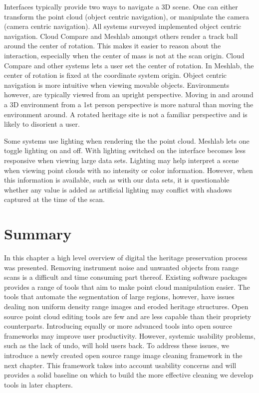 Interfaces typically provide two ways to navigate a 3D scene. One can either transform the point cloud (object centric navigation), or manipulate the camera (camera centric navigation). All systems surveyed implemented object centric navigation. Cloud Compare and Meshlab amongst others render a track ball around the center of rotation. This makes it easier to reason about the interaction, especially when the center of mass is not at the scan origin. Cloud Compare and other systems lets a user set the center of rotation. In Meshlab, the center of rotation is fixed at the coordinate system origin. Object centric navigation is more intuitive when viewing movable objects. Environments however, are typically viewed from an upright perspective. Moving in and around a 3D environment from a 1st person perspective is more natural than moving the environment around. A rotated heritage site is not a familiar perspective and is likely to disorient a user.

Some systems use lighting when rendering the the point cloud. Meshlab lets one toggle lighting on and off. With lighting switched on the interface becomes less responsive when viewing large data sets. Lighting may help interpret a scene when viewing point clouds with no intensity or color information. However, when this information is available, such as with our data sets, it is questionable whether any value is added as artificial lighting may conflict with shadows captured at the time of the scan.


\section{Summary}
In this chapter a high level overview of digital the heritage preservation process was presented. Removing instrument noise and unwanted objects from range scans is a difficult and time consuming part thereof. Existing software packages provides a range of tools that aim to make point cloud manipulation easier. The tools that automate the segmentation of large regions, however, have issues dealing non uniform density range images and eroded heritage structures. Open source point cloud editing tools are few and are less capable than their propriety counterparts. Introducing equally or more advanced tools into open source frameworks may improve user productivity. However, systemic usability problems, such as the lack of undo, will hold users back. To address these issues, we introduce a newly created open source range image cleaning framework in the next chapter. This framework takes into account usability concerns and will provides a solid baseline on which to build the more effective cleaning we develop tools in later chapters.


